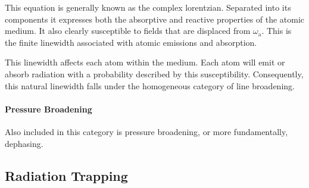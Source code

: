This equation is generally known as the complex lorentzian. Separated into its
components it expresses both the absorptive and reactive properties of the
atomic medium. It also clearly susceptible to fields that are displaced from
$\omega_\mathrm{a}$. This is the finite linewidth associated with atomic
emissions and absorption.

This linewidth affects each atom within the medium. Each atom will emit or
absorb radiation with a probability described by this susceptibility.
Consequently, this natural linewidth falls under the homogeneous category of
line broadening.

\paragraph{Pressure Broadening}
Also included in this category is pressure broadening, or more fundamentally,
dephasing. 

\subsection{Radiation Trapping}
